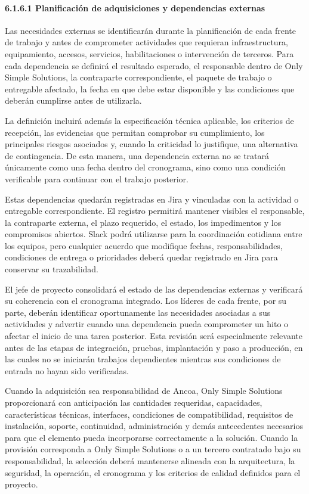 \documentclass[11pt]{article}
\begin{document}
\paragraph{6.1.6.1 Planificación de adquisiciones y dependencias externas}\label{6-1-6-1-planificacion-de-adquisiciones-y-dependencias-externas}

Las necesidades externas se identificarán durante la planificación de cada frente de trabajo y antes de comprometer actividades que requieran infraestructura, equipamiento, accesos, servicios, habilitaciones o intervención de terceros. Para cada dependencia se definirá el resultado esperado, el responsable dentro de Only Simple Solutions, la contraparte correspondiente, el paquete de trabajo o entregable afectado, la fecha en que debe estar disponible y las condiciones que deberán cumplirse antes de utilizarla.

La definición incluirá además la especificación técnica aplicable, los
criterios de recepción, las evidencias que permitan comprobar su
cumplimiento, los principales riesgos asociados y, cuando la criticidad
lo justifique, una alternativa de contingencia. De esta manera, una
dependencia externa no se tratará únicamente como una fecha dentro del
cronograma, sino como una condición verificable para continuar con el
trabajo posterior.

Estas dependencias quedarán registradas en Jira y vinculadas con la
actividad o entregable correspondiente. El registro permitirá mantener
visibles el responsable, la contraparte externa, el plazo requerido, el
estado, los impedimentos y los compromisos abiertos. Slack podrá
utilizarse para la coordinación cotidiana entre los equipos, pero
cualquier acuerdo que modifique fechas, responsabilidades, condiciones
de entrega o prioridades deberá quedar registrado en Jira para conservar
su trazabilidad.

El jefe de proyecto consolidará el estado de las dependencias externas y
verificará su coherencia con el cronograma integrado. Los líderes de
cada frente, por su parte, deberán identificar oportunamente las
necesidades asociadas a sus actividades y advertir cuando una
dependencia pueda comprometer un hito o afectar el inicio de una tarea
posterior. Esta revisión será especialmente relevante antes de las
etapas de integración, pruebas, implantación y paso a producción, en las
cuales no se iniciarán trabajos dependientes mientras sus condiciones de
entrada no hayan sido verificadas.

Cuando la adquisición sea responsabilidad de Ancoa, Only Simple
Solutions proporcionará con anticipación las cantidades requeridas,
capacidades, características técnicas, interfaces, condiciones de
compatibilidad, requisitos de instalación, soporte, continuidad,
administración y demás antecedentes necesarios para que el elemento
pueda incorporarse correctamente a la solución. Cuando la provisión
corresponda a Only Simple Solutions o a un tercero contratado bajo su
responsabilidad, la selección deberá mantenerse alineada con la
arquitectura, la seguridad, la operación, el cronograma y los criterios
de calidad definidos para el proyecto.
\end{document}
